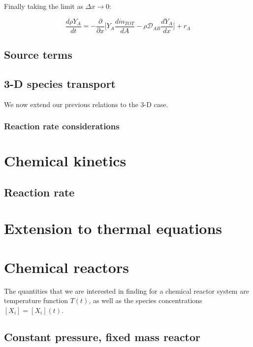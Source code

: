 \documentclass[10pt,twocolumn]{article}
\begin{document}
Finally taking the limit as $\Delta x \rightarrow 0$:

\begin{equation}
\frac{d \rho Y_{A} }{dt} = - \frac{\partial}{\partial x}\Big[ Y_A \frac{d \dot{m}_{TOT}}{d A} - \rho \mathcal{D}_{AB} \frac{dY_A}{dx} \Big] + r_A
\end{equation}






\subsection{Source terms}

\subsection{3-D species transport}

We now extend our previous relations to the 3-D case.

\subsubsection{Reaction rate considerations}


\section{Chemical kinetics}

\subsection{Reaction rate}






\section{Extension to thermal equations}




\section{Chemical reactors}

The quantities that we are interested in finding for a chemical reactor system are temperature function $T(t)$, as well as the species concentrations $[X_i] = [X_i](t)$.

\subsection{Constant pressure, fixed mass reactor}
\end{document}
